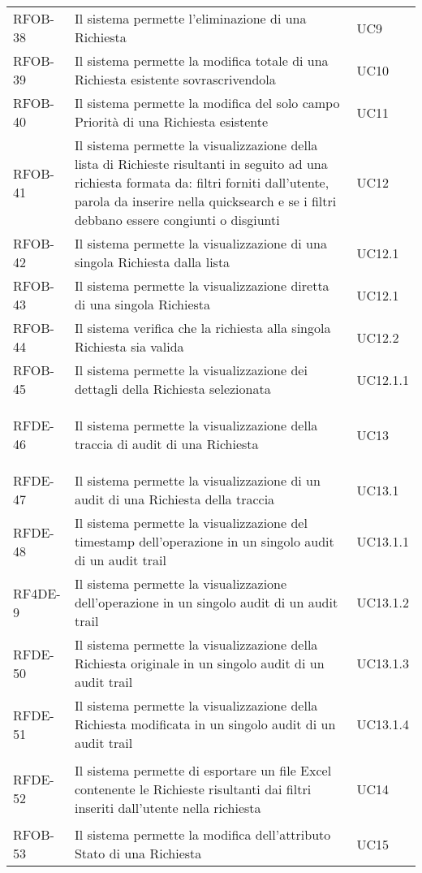 \begin{center}
\begin{longtable}{p{2.0cm}|p{8cm}|p{2.7cm}}
RFOB-38  & Il sistema permette l'eliminazione di una Richiesta & UC9 \\ 
RFOB-39  & Il sistema permette la modifica totale di una Richiesta esistente sovrascrivendola & UC10 \\ 
RFOB-40  & Il sistema permette la modifica del solo campo Priorità di una Richiesta esistente & UC11 \\ 
RFOB-41  & Il sistema permette la visualizzazione della lista di Richieste risultanti in seguito ad una richiesta formata da: filtri forniti dall'utente, parola da inserire nella quicksearch e se i filtri debbano essere congiunti o disgiunti & UC12 \\ 
RFOB-42  & Il sistema permette la visualizzazione di una singola Richiesta dalla lista & UC12.1 \\ 
RFOB-43  & Il sistema permette la visualizzazione diretta di una singola Richiesta & UC12.1 \\ 
RFOB-44  & Il sistema verifica che la richiesta alla singola Richiesta sia valida & UC12.2 \\ 
RFOB-45  & Il sistema permette la visualizzazione dei dettagli della Richiesta selezionata & UC12.1.1 \\ 



\hypertarget{rf46}{RFDE-46}  & Il sistema permette la visualizzazione della traccia di audit di una Richiesta & UC13 \\ 
RFDE-47  & Il sistema permette la visualizzazione di un audit di una Richiesta della traccia & UC13.1 \\ 
RFDE-48  & Il sistema permette la visualizzazione del timestamp dell'operazione in un singolo audit di un audit trail & UC13.1.1 \\ 
RF4DE-9  & Il sistema permette la visualizzazione dell'operazione in un singolo audit di un audit trail & UC13.1.2 \\ 
RFDE-50  & Il sistema permette la visualizzazione della Richiesta originale in un singolo audit di un audit trail & UC13.1.3 \\ 
RFDE-51  & Il sistema permette la visualizzazione della Richiesta modificata in un singolo audit di un audit trail & UC13.1.4 \\ 



\hypertarget{rf52}{RFDE-52}  & Il sistema permette di esportare un file Excel contenente le Richieste risultanti dai filtri inseriti dall'utente nella richiesta & UC14 \\ 
RFOB-53  & Il sistema permette la modifica dell'attributo Stato di una Richiesta & UC15 \\ 


\end{longtable}
\end{center}
